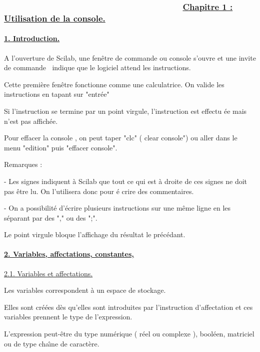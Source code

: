 \documentclass{article}
\begin{document}
\subsubsection{ \ \ \ \ \ \ \ \ \ \ \ \ \ \ \ \ \ \ \ \ \ \ \ \ \ \ \ \ \ \
\ \ \ \ \ \ \ \ \protect\underline{Chapitre 1 : Utilisation de la console.}}

\paragraph{\protect\underline{1. Introduction.}}

A l'ouverture de Scilab, une fen\^{e}tre de commande ou console s'ouvre et
une invite de commande $\ $\frame{$-\rightarrow $} indique que le logiciel
attend les instructions.

Cette premi\`{e}re fen\^{e}tre fonctionne comme une calculatrice. On valide
les instructions en tapant sur "entr\'{e}e"

Si l'instruction se termine par un point virgule, l'instruction est effectu%
\'{e}e mais n'est pas affich\'{e}e.

Pour effacer la console , on peut taper "clc" ( clear console") ou aller
dans le menu "edition" puis "effacer console".

Remarques :

- Les signes \frame{//} indiquent \`{a} Scilab que tout ce qui est \`{a}
droite de ces signes ne doit pas \^{e}tre lu. On l'utilisera donc pour \'{e}%
crire des commentaires.

- On a possibilit\'{e} d'\'{e}crire plusieurs instructions sur une m\^{e}me
ligne en les s\'{e}parant par des "," ou des ";".

Le point virgule bloque l'affichage du r\'{e}sultat le pr\'{e}c\'{e}dant.

\paragraph{\protect\underline{2. Variables, affectations, constantes,}}

\underline{2.1. Variables et affectations.}

Les variables correspondent \`{a} un espace de stockage.

Elles sont cr\'{e}\'{e}es d\`{e}s qu'elles sont introduites par
l'instruction d'affectation  et ces variables prennent le type de
l'expression.


L'expression peut-\^{e}tre du type num\'{e}rique ( r\'{e}el ou complexe ),
bool\'{e}en, matriciel ou de type cha\^{\i}ne de caract\`{e}re.
\end{document}
